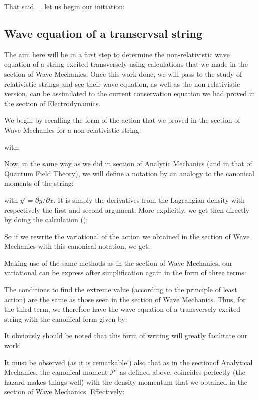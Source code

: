 	That said ... let us begin our initiation:
	
	\subsection{Wave equation of a transervsal string}
	The aim here will be in a first step to determine the non-relativistic wave equation of a string excited transversely using calculations that we made in the section of Wave Mechanics. Once this work done, we will pass to the study of relativistic strings and see their wave equation, as well as the non-relativistic version, can be assimilated to the current conservation equation we had proved in the section of Electrodynamics.
	
	We begin by recalling the form of the action that we proved in the section of Wave Mechanics for a non-relativistic string:
	
	with:
	
	Now, in the same way as we did in section of Analytic Mechanics (and in that of Quantum Field Theory), we will define a notation by an analogy to the canonical moments of the string:
	
	with $y'=\partial y/\partial x$. It is simply the derivatives from the Lagrangian density with respectively the first and second argument. More explicitly, we get then directly by doing the calculation ():
	
	So if we rewrite the variational of the action we obtained in the section of Wave Mechanics with this canonical notation, we get:
	
	Making use of the same methods as in the section of Wave Mechanics, our variational can be express after simplification again in the form of three terms:
	
	The conditions to find the extreme value (according to the principle of least action) are the same as those seen in the section of Wave Mechanics. Thus, for the third term, we therefore have the wave equation of a transversely excited string with the canonical form given by:
	
	\begin{tcolorbox}[title=Remark,colframe=black,arc=10pt]
	It obviously should be noted that this form of writing will greatly facilitate our work!
	\end{tcolorbox}
	It must be observed (as it is remarkable!) also that as in the sectionof Analytical Mechanics, the canonical moment $\mathcal{P}^t$ as defined above, coincides perfectly (the hazard makes things well) with the density momentum that we obtained in the section of Wave Mechanics. Effectively:
	
